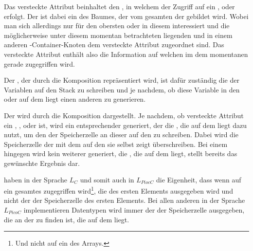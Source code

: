 Das \textcolor{gray!90!black}{versteckte Attribut}  beinhaltet den , in welchem der Zugriff auf ein ,  oder  erfolgt. Der  ist dabei ein  des Baumes, der vom gesamten  der  gebildet wird. Wobei man sich allerdings nur für den obersten  oder  in diesem  interessiert und die möglicherweise unter diesem momentan betrachteten  liegenden  und  in einem anderen -Container-Knoten dem \textcolor{gray!90!black}{versteckte Attribut} zugeordnet sind. Das \textcolor{gray!90!black}{versteckte Attribut}  enthält also die Information auf welchen  im dem momentanen  gerade zugegriffen wird.

Der , der durch die Komposition  repräsentiert wird, ist dafür zuständig die  der Variablen  auf den Stack zu schreiben und je nachdem, ob diese Variable in den  oder auf dem  liegt einen anderen  zu generieren.

Der  wird durch die Komposition  dargestellt. Je nachdem, ob \textcolor{gray!90!black}{versteckte Attribut}  ein , ,  oder  ist, wird ein entsprechender  generiert, der die , die auf dem  liegt dazu nutzt, um den  der Speicherzelle an dieser  auf den  zu schreiben. Dabei wird die Speicherzelle der  mit dem  auf den sie selbst zeigt überschreiben. Bei einem  hingegen wird kein weiterer  generiert, die , die auf dem  liegt, stellt bereits das gewünschte Ergebnis dar.

 haben in der Sprache $L_C$ und somit auch in $L_{PiocC}$ die Eigenheit, dass wenn auf ein gesamtes  zugegriffen wird\footnote{Und nicht auf ein  des Arrays.}, die  des ersten Elements ausgegeben wird und nicht der  der Speicherzelle des ersten Elements. Bei allen anderen in der Sprache $L_{PicoC}$ implementieren Datentypen wird immer der  der Speicherzelle ausgegeben, die an der  zu finden ist, die auf dem  liegt.


